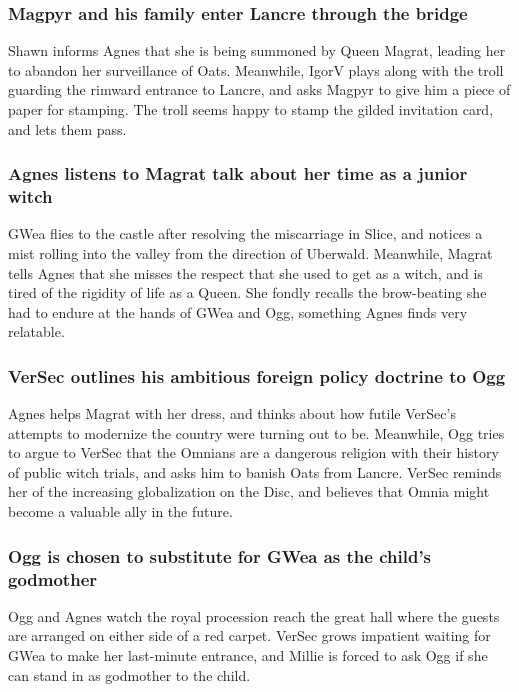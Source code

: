 \subsubsection{\Gls{Magpyr} and his family enter Lancre through the bridge}
\Gls{Shawn} informs \Gls{Agnes} that she is being summoned by Queen \Gls{Magrat}, leading her to
abandon her surveillance of \Gls{Oats}. Meanwhile, \Gls{IgorV} plays along with the troll guarding
the rimward entrance to Lancre, and asks \Gls{Magpyr} to give him a piece of paper for stamping.
The troll seems happy to stamp the gilded invitation card, and lets them pass.

\subsubsection{\Gls{Agnes} listens to \Gls{Magrat} talk about her time as a junior witch}
\Gls{GWea} flies to the castle after resolving the miscarriage in Slice, and notices a mist rolling
into the valley from the direction of Uberwald. Meanwhile, \Gls{Magrat} tells \Gls{Agnes} that
she misses the respect that she used to get as a witch, and is tired of the rigidity of life as a
Queen. She fondly recalls the brow-beating she had to endure at the hands of \Gls{GWea} and
\Gls{Ogg}, something \Gls{Agnes} finds very relatable.

\subsubsection{\Gls{VerSec} outlines his ambitious foreign policy doctrine to \Gls{Ogg}}
\Gls{Agnes} helps \Gls{Magrat} with her dress, and thinks about how futile \Gls{VerSec}'s
attempts to modernize the country were turning out to be. Meanwhile, \Gls{Ogg} tries to argue to
\Gls{VerSec} that the Omnians are a dangerous religion with their history of public witch trials,
and asks him to banish \Gls{Oats} from Lancre. \Gls{VerSec} reminds her of the increasing
globalization on the Disc, and believes that Omnia might become a valuable ally in the future.

\subsubsection{\Gls{Ogg} is chosen to substitute for \Gls{GWea} as the child's godmother}
\Gls{Ogg} and \Gls{Agnes} watch the royal procession reach the great hall where the guests are
arranged on either side of a red carpet. \Gls{VerSec} grows impatient waiting for \Gls{GWea} to make
her last-minute entrance, and \Gls{Millie} is forced to ask \Gls{Ogg} if she can stand in as
godmother to the child.

